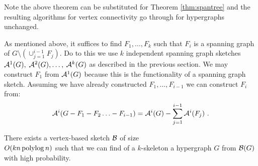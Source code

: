 Note the above theorem can be substituted for Theorem \ref{thm:spantree} and the resulting algorithms for vertex connectivity go through for hypergraphs unchanged. 
%

%

 
As mentioned above, it suffices to find $F_1, \ldots, F_k$ such that $F_i$ is a spanning graph of $G\setminus   (\cup_{j=1}^{i-1} F_{j} )$. 
Do to this we use  $k$ independent spanning graph sketches ${\cal A}^1(G), $ $ {\cal A}^2(G), \ldots, $ $ {\cal A}^k(G)$ as described in the previous section. We may construct $F_1$ from ${\cal A}^1(G)$ because this is the functionality of a spanning graph sketch. Assuming we have already constructed $F_1, \ldots, F_{i-1}$ we can construct $F_i$ from:
\[
{\cal A}^i(G-F_1-F_2\ldots - F_{i-1})={\cal A}^i(G)-\sum_{j=1}^{i-1} {\cal A}^i(F_j) \ .
\]


\begin{theorem}
There exists a vertex-based sketch ${\cal B}$ of size \\ $O(kn\operatorname{polylog} n)$ such that we can  find of a $k$-skeleton  a hypergraph $G$ from ${\cal B}(G)$ with high probability.
\end{theorem}

